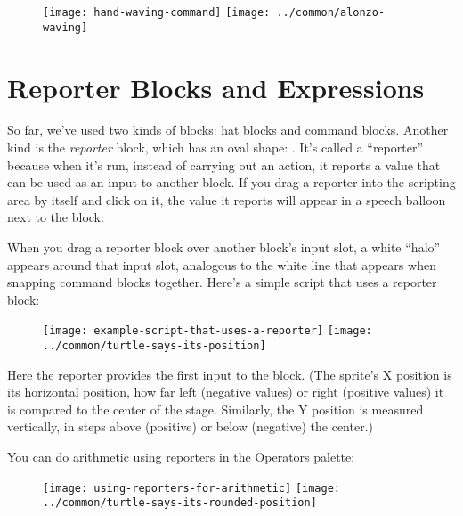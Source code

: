 \documentclass{report}
\begin{document}
\begin{figure}[H]
\centering
\texttt{[image: hand-waving-command]}%
\hspace{2em}%
\texttt{[image: ../common/alonzo-waving]}
\end{figure}

\section{Reporter Blocks and Expressions}

So far, we've used two kinds of blocks: hat blocks and command blocks. Another kind is the \emph{reporter} block, which has an oval shape: . It's called a ``reporter'' because when it's run, instead of carrying out an action, it reports a value that can be used as an input to another block. If you drag a reporter into the scripting area by itself and click on it, the value it reports will appear in a speech balloon next to the block:


When you drag a reporter block over another block's input slot, a white ``halo'' appears around that input slot, analogous to the white line that appears when snapping command blocks together. Here's a simple script that uses a reporter block:

\begin{figure}[H]
\centering
\texttt{[image: example-script-that-uses-a-reporter]}%
\hspace{2em}%
\texttt{[image: ../common/turtle-says-its-position]}
\end{figure}

Here the  reporter provides the first input to the  block. (The sprite's X position is its horizontal position, how far left (negative values) or right (positive values) it is compared to the center of the stage. Similarly, the Y position is measured vertically, in steps above (positive) or below (negative) the center.)

You can do arithmetic using reporters in the Operators palette: 

\begin{figure}[H]
\centering
\texttt{[image: using-reporters-for-arithmetic]}%
\hspace{2em}%
\texttt{[image: ../common/turtle-says-its-rounded-position]}
\end{figure}
\end{document}
